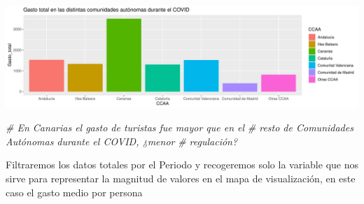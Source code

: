 \documentclass[data,article,submit,moreauthors,pdftex]{Definitions/mdpi}
\newenvironment{Shaded}{\begin{snugshade}}{\end{snugshade}}
\newcommand{\CommentTok}[1]{\textcolor[rgb]{0.56,0.35,0.01}{\textit{#1}}}
\begin{document}
\includegraphics{ProyectoAED2024_Rmd_files/figure-latex/unnamed-chunk-25-1.pdf}

\begin{Shaded}
\begin{Highlighting}[]
\CommentTok{\# En Canarias el gasto de turistas fue mayor que en el}
\CommentTok{\# resto de Comunidades Autónomas durante el COVID, ¿menor}
\CommentTok{\# regulación?}
\end{Highlighting}
\end{Shaded}

Filtraremos los datos totales por el Periodo y recogeremos solo la
variable que nos sirve para representar la magnitud de valores en el
mapa de visualización, en este caso el gasto medio por persona
\end{document}
